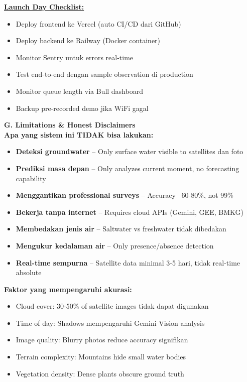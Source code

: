 \documentclass[12pt,a4paper]{article}
\newcommand{\subsectionbox}[1]{%
  \textbf{\large #1}\\[0.3cm]
}
\begin{document}
\textbf{\underline{Launch Day Checklist:}}
\begin{itemize}
  \item Deploy frontend ke Vercel (auto CI/CD dari GitHub)
  \item Deploy backend ke Railway (Docker container)
  \item Monitor Sentry untuk errors real-time
  \item Test end-to-end dengan sample observation di production
  \item Monitor queue length via Bull dashboard
  \item Backup pre-recorded demo jika WiFi gagal
\end{itemize}

\vspace{0.5cm}

\subsectionbox{G. Limitations \& Honest Disclaimers}

\textbf{Apa yang sistem ini TIDAK bisa lakukan:}
\begin{itemize}
  \item \textbf{Deteksi groundwater} -- Only surface water visible to satellites dan foto
  \item \textbf{Prediksi masa depan} -- Only analyzes current moment, no forecasting capability
  \item \textbf{Menggantikan professional surveys} -- Accuracy ~60-80\%, not 99\%
  \item \textbf{Bekerja tanpa internet} -- Requires cloud APIs (Gemini, GEE, BMKG)
  \item \textbf{Membedakan jenis air} -- Saltwater vs freshwater tidak dibedakan
  \item \textbf{Mengukur kedalaman air} -- Only presence/absence detection
  \item \textbf{Real-time sempurna} -- Satellite data minimal 3-5 hari, tidak real-time absolute
\end{itemize}

\textbf{Faktor yang mempengaruhi akurasi:}
\begin{itemize}
  \item Cloud cover: 30-50\% of satellite images tidak dapat digunakan
  \item Time of day: Shadows mempengaruhi Gemini Vision analysis
  \item Image quality: Blurry photos reduce accuracy signifikan
  \item Terrain complexity: Mountains hide small water bodies
  \item Vegetation density: Dense plants obscure ground truth
\end{itemize}
\end{document}
